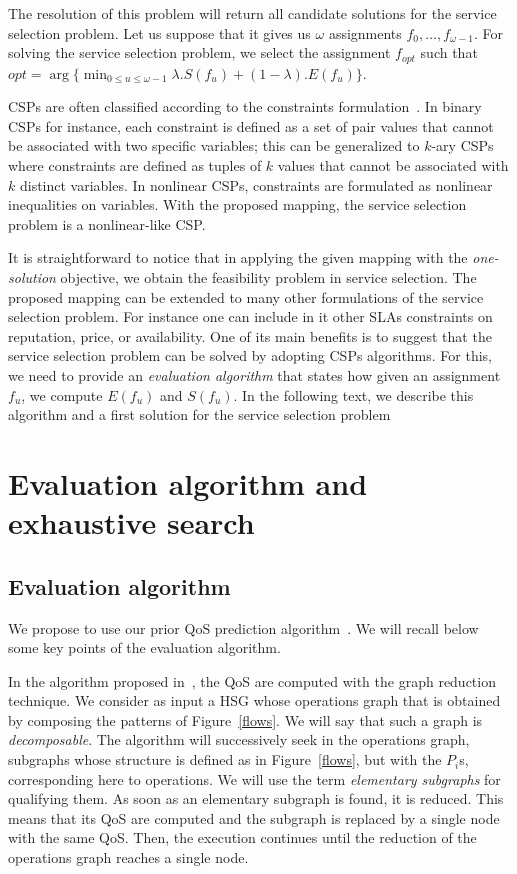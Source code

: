 \documentclass[a4paper]{article}
\begin{document}
The resolution of this problem will return all candidate solutions for the service selection problem. 
Let us suppose that it gives us $\omega$ assignments $f_0, \dots, f_{\omega -1}$. For solving the service 
selection problem, we select the assignment $f_{opt}$ such that 
$\displaystyle opt = \arg \{ \min_{0\leq u \leq \omega-1} \lambda.S(f_{u}) + (1-\lambda).E(f_u) \}$. 

CSPs are often classified according to the constraints formulation~\cite{Baker95intelligentbacktracking}. 
In binary CSPs for instance, each constraint is defined as a set of pair values that cannot be associated 
with two specific variables; this can be generalized to $k$-ary CSPs where constraints are defined as 
tuples of $k$ values that cannot be associated with $k$ distinct variables. In nonlinear CSPs, constraints are 
formulated as nonlinear inequalities on variables. With the proposed mapping, 
the service selection problem is a nonlinear-like CSP. 

It is straightforward to notice that in 
applying the given mapping with the {\it one-solution} objective, we obtain the feasibility problem 
in service selection. 
The proposed mapping can be extended to many other formulations of the service selection problem. 
For instance one can include in it other SLAs constraints on reputation, price, or availability. 
One of its main benefits is to suggest that the service selection problem can be solved by adopting CSPs 
algorithms. For this, we need to provide an {\it evaluation algorithm} that states how given an 
assignment $f_u$, we compute $E(f_u)$ and $S(f_u)$. 
In the following text, we describe this algorithm and a first solution for the service selection problem


\section{Evaluation algorithm and exhaustive search} \label{exhaustiveSearch}

\subsection{Evaluation algorithm} \label{evaluationAlgorithm}

We propose to use our prior QoS prediction algorithm~\cite{GoldmanNgoko}. 
We will recall below some key points of the evaluation algorithm.

In the algorithm proposed in~\cite{GoldmanNgoko}, the QoS are computed with the graph reduction technique. 
We consider as input a HSG whose operations graph that is obtained by composing the patterns of Figure~\ref{flows}. We 
will say that such a graph is {\it decomposable}. The algorithm will successively seek in the operations graph,  
subgraphs whose structure is defined as in Figure~\ref{flows}, but with the $P_i$s, corresponding 
here to operations. We will use the term \textit{elementary subgraphs} for qualifying them. 
As soon as an elementary subgraph is found, it is reduced. This means that its QoS 
are computed and the subgraph is replaced by a single node with the same QoS. Then, the execution 
continues until the reduction of the operations graph reaches a single node.
\end{document}
